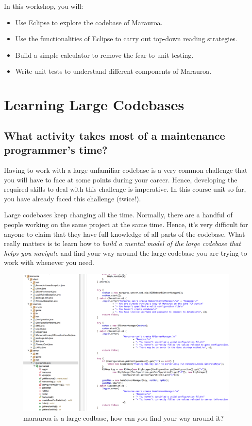 \documentclass[
]{book}
\providecommand{\tightlist}{%
  \setlength{\itemsep}{0pt}\setlength{\parskip}{0pt}}
\begin{document}
In this workshop, you will:

\begin{itemize}
\tightlist
\item
  Use Eclipse to explore the codebase of Marauroa.
\item
  Use the functionalities of Eclipse to carry out top-down reading strategies.
\item
  Build a simple calculator to remove the fear to unit testing.
\item
  Write unit tests to understand different components of Marauroa.
\end{itemize}

\hypertarget{largecode}{%
\section{Learning Large Codebases}\label{largecode}}

\hypertarget{timesink}{%
\subsection{What activity takes most of a maintenance programmer's time?}\label{timesink}}

Having to work with a large unfamiliar codebase is a very common challenge that you will have to face at some points during your career. Hence, developing the required skills to deal with this challenge is imperative. In this course unit so far, you have already faced this challenge (twice!).

Large codebases keep changing all the time. Normally, there are a handful of people working on the same project at the same time. Hence, it's very difficult for anyone to claim that they have full knowledge of all parts of the codebase. What really matters is to learn how to \emph{build a mental model of the large codebase that helps you navigate} and find your way around the large codebase you are trying to work with whenever you need.

\begin{figure}

{\centering \includegraphics[width=1\linewidth]{images/marauroa} 

}

\caption{marauroa is a large codbase, how can you find your way around it?}\label{fig:marauroa-fig}
\end{figure}
\end{document}
